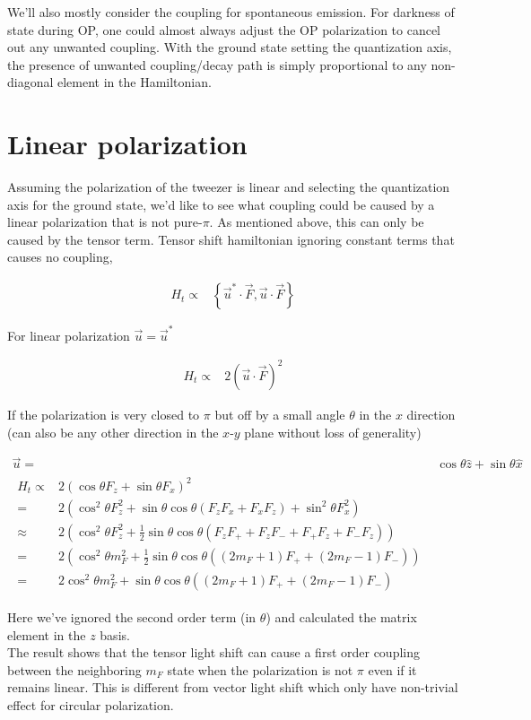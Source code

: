 \documentclass[10pt,fleqn]{article}
\newcommand{\eqar}[1]
{
  \begin{align}
    #1
  \end{align}
}
\newcommand{\paren}[1]{{\left({#1}\right)}}
\newcommand{\crly}[1]{{\left\{{#1}\right\}}}
\begin{document}
We'll also mostly consider the coupling for spontaneous emission.
For darkness of state during OP, one could almost always adjust the OP polarization
to cancel out any unwanted coupling. With the ground state
setting the quantization axis, the presence of unwanted coupling/decay path
is simply proportional to any non-diagonal element in the Hamiltonian.\\

\section{Linear polarization}
\label{lin-pol}

Assuming the polarization of the tweezer is linear and selecting the quantization axis
for the ground state, we'd like to see what coupling could be
caused by a linear polarization that is not pure-$\pi$. As mentioned above,
this can only be caused by the tensor term.
Tensor shift hamiltonian ignoring constant terms that causes no coupling,
\eqar{
  H_t\propto&\crly{\vec{u}^*\cdot\vec F,\vec{u}\cdot\vec F}
}

For linear polarization $\vec{u}=\vec{u}^*$
\eqar{
  H_t\propto&2\paren{\vec{u}\cdot\vec F}^2
}

If the polarization is very closed to $\pi$ but off by a small angle $\theta$
in the $x$ direction (can also be any other direction in the $x$-$y$ plane
without loss of generality)
\eqar{
  \vec{u}=&\cos\theta \hat z + \sin\theta \hat x\\
  \begin{split}
    H_t\propto&2\paren{\cos\theta F_z+\sin\theta F_x}^2\\
    =&2\paren{\cos^2\theta F_z^2+\sin\theta\cos\theta\paren{F_zF_x+F_xF_z}+\sin^2\theta F_x^2}\\
    \approx&2\paren{\cos^2\theta F_z^2+\frac{1}{2}\sin\theta\cos\theta\paren{F_zF_++F_zF_-+F_+F_z+F_-F_z}}\\
    =&2\paren{\cos^2\theta m_F^2+\frac{1}{2}\sin\theta\cos\theta\paren{\paren{2m_F+1}F_++\paren{2m_F-1}F_-}}\\
    =&2\cos^2\theta m_F^2+\sin\theta\cos\theta\paren{\paren{2m_F+1}F_++\paren{2m_F-1}F_-}
  \end{split}
}
Here we've ignored the second order term (in $\theta$)
and calculated the matrix element in the $z$ basis.\\

The result shows that the tensor light shift can cause a first order coupling between
the neighboring $m_F$ state when the polarization is not $\pi$
even if it remains linear. This is different from vector light shift
which only have non-trivial effect for circular polarization.\\
\end{document}
